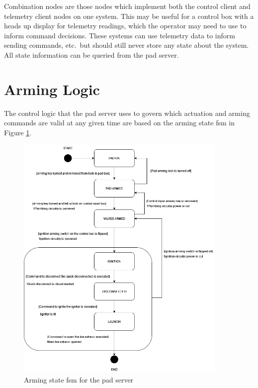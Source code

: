 Combination nodes are those nodes which implement both the control client and telemetry client nodes on one system.
This may be useful for a control box with a heads up display for telemetry readings, which the operator may need to use
to inform command decisions. These systems can use telemetry data to inform sending commands, etc.\ but should still
never store any state about the system. All state information can be queried from the pad server.

\section{Arming Logic}

The control logic that the pad server uses to govern which actuation and arming commands are valid at any given time
are based on the arming state \gls{fsm} in Figure \ref{fig:arming-fsm}.

\begin{figure}[H]
    \center
    \includegraphics[width=4in]{assets/diagrams/Hybrid_Control_FSM.png}
    \caption{Arming state \gls{fsm} for the pad server}
    \label{fig:arming-fsm}
\end{figure}

